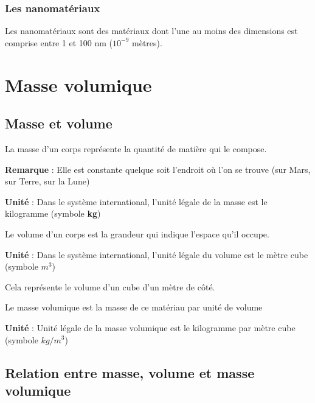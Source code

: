 \documentclass[a4paper,12pt]{article}
\begin{document}
\subsubsection{Les nanomatériaux}

\begin{tcolorbox}[colback=green!10!white, colframe=green!75!black, title=Définition : Matériaux composites]
  Les nanomatériaux sont des matériaux dont l'une au moins des dimensions est comprise
  entre 1 et 100 \unit{\nm} (\(10^{-9}\) mètres).
\end{tcolorbox}

\section{Masse volumique}

\subsection{Masse et volume}

\begin{tcolorbox}
  La masse d'un corps représente la quantité de matière qui le compose. \par
  \textbf{Remarque} : Elle est constante quelque soit l'endroit où l'on se trouve (sur Mars, sur Terre, sur la Lune) \par
  \textbf{Unité} : Dans le système international, l'unité légale de la masse est le kilogramme (symbole \textbf{kg})
  
\end{tcolorbox}
  
\begin{tcolorbox}
    Le volume d'un corps est la grandeur qui indique l'espace qu'il occupe. \par
    \textbf{Unité} : Dans le système international, l'unité légale du volume est le mètre cube (symbole \textbf{$m^3$})
\end{tcolorbox}
  
Cela représente le volume d'un cube d'un mètre de côté.
  
  \begin{tcolorbox}
    Le masse volumique est la masse de ce matériau par unité de volume \par
    \textbf{Unité} : Unité légale de la masse volumique est le kilogramme par mètre cube (symbole \textbf{$kg / m^3$})
  \end{tcolorbox}
  
\subsection{Relation entre masse, volume et masse volumique}
  
\end{document}
